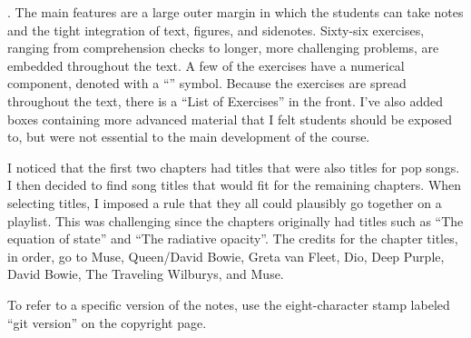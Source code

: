 . The main features are a large outer margin in which the students can take notes and the tight integration of text, figures, and sidenotes. Sixty-six exercises, ranging from comprehension checks to longer, more challenging problems, are embedded throughout the text. A few of the exercises have a numerical component, denoted with a ``\notebook'' symbol. Because the exercises are spread throughout the text, there is a ``List of Exercises'' in the front. I've also added boxes containing more advanced material that I felt students should be exposed to, but were not essential to the main development of the course. 

 I noticed that the first two chapters had titles that were also titles for pop songs. I then decided to find song titles that would fit for the remaining chapters. When selecting titles, I imposed a rule that they all could plausibly go together on a playlist. This was challenging since the chapters originally had titles such as ``The equation of state'' and ``The radiative opacity''. The credits for the chapter titles, in order, go to Muse, Queen/David Bowie, Greta van Fleet, Dio, Deep Purple, David Bowie, The Traveling Wilburys, and Muse.

 To refer to a specific version of the notes, use the eight-character stamp labeled ``git version'' on the copyright page.
